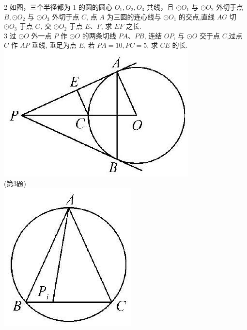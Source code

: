 \documentclass[10pt]{article}
\begin{document}
2 如图，三个半径都为 1 的圆的圆心 $O_{1}, O_{2}, O_{3}$ 共线，且 $\odot O_{1}$ 与 $\odot O_{2}$ 外切于点 $B, \odot O_{2}$ 与 $\odot O_{3}$ 外切于点 $C$, 点 $A$ 为三圆的连心线与 $\odot O_{1}$ 的交点,直线 $A G$ 切 $\odot O_{3}$ 于点 $G$, 交 $\odot O_{2}$ 于点 $E 、 F$, 求 $E F$ 之长.\\
3 过 $\odot O$ 外一点 $P$ 作 $\odot O$ 的两条切线 $P A 、 P B$, 连结 $O P$, 与 $\odot O$ 交于点 $C$,过点 $C$ 作 $A P$ 垂线, 垂足为点 $E$, 若 $P A=10, P C=5$, 求 $C E$ 的长.\\
\includegraphics[max width=\textwidth, center]{2024_10_30_66b8e5e701da2093c133g-057(5)}\\
(第3题)\\
\includegraphics[max width=\textwidth, center]{2024_10_30_66b8e5e701da2093c133g-057(4)}\\
\end{document}
